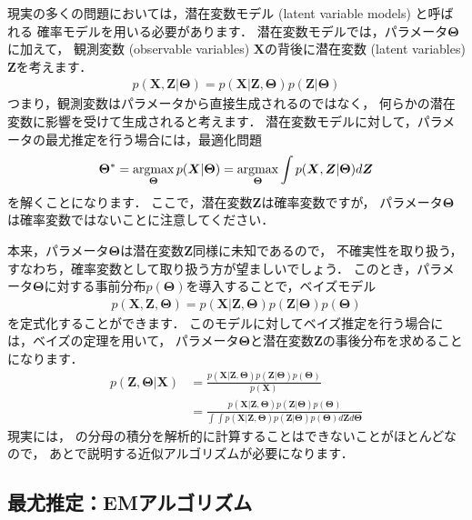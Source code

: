 現実の多くの問題においては，潜在変数モデル (latent variable models) と呼ばれる
確率モデルを用いる必要があります．
潜在変数モデルでは，パラメータ$\bm\Theta$に加えて，
観測変数 (observable variables) $\bm{X}$の背後に潜在変数 (latent variables) $\bm{Z}$を考えます．
\begin{align}
p(\bm{X},\bm{Z}|\bm\Theta) = p(\bm{X}|\bm{Z},\bm\Theta) p(\bm{Z} | \bm\Theta)
\end{align}
つまり，観測変数はパラメータから直接生成されるのではなく，
何らかの潜在変数に影響を受けて生成されると考えます．
潜在変数モデルに対して，パラメータの最尤推定を行う場合には，最適化問題
\begin{align}
\bm\Theta^* = \argmax_{\bm\Theta} p(\bm{X}|\bm\Theta) = \argmax_{\bm\Theta} \int p(\bm{X},\bm{Z}|\bm\Theta) d\bm{Z}
\label{eq:model_ml}
\end{align}
を解くことになります．
ここで，潜在変数$\bm{Z}$は確率変数ですが，
パラメータ$\bm\Theta$は確率変数ではないことに注意してください．

本来，パラメータ$\bm\Theta$は潜在変数$\bm{Z}$同様に未知であるので，
不確実性を取り扱う，すなわち，確率変数として取り扱う方が望ましいでしょう．
このとき，パラメータ$\bm\Theta$に対する事前分布$p(\bm\Theta)$を導入することで，ベイズモデル
\begin{align}
p(\bm{X},\bm{Z},\bm\Theta) = p(\bm{X}|\bm{Z},\bm\Theta) p(\bm{Z} | \bm\Theta) p(\bm\Theta)
\end{align}
を定式化することができます．
このモデルに対してベイズ推定を行う場合には，ベイズの定理を用いて，
パラメータ$\bm\Theta$と潜在変数$\bm{Z}$の事後分布を求めることになります．
\begin{align}
 p(\bm{Z},\bm\Theta|\bm{X}) 
 &= \frac{p(\bm{X}|\bm{Z},\bm\Theta) p(\bm{Z} | \bm\Theta) p(\bm\Theta)}{p(\bm{X})}
 \nonumber\\
 &= \frac{p(\bm{X}|\bm{Z},\bm\Theta) p(\bm{Z} | \bm\Theta) p(\bm\Theta)}
 {\int\int p(\bm{X}|\bm{Z},\bm\Theta) p(\bm{Z} | \bm\Theta) p(\bm\Theta)d\bm{Z}d\bm\Theta}
\label{eq:model_bayes}
\end{align}
現実には，
の分母の積分を解析的に計算することはできないことがほとんどなので，
あとで説明する近似アルゴリズムが必要になります．

\subsection{最尤推定：EMアルゴリズム}
\label{sec:em}

